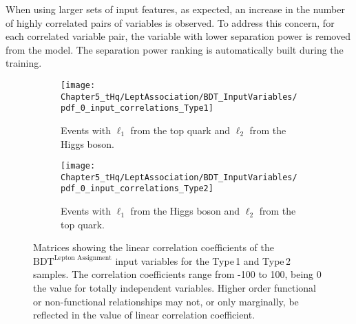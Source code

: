 When using larger sets of input features, as expected, an increase in the number 
of highly correlated pairs of variables is observed. To address this concern, for each 
correlated variable pair, the variable with lower separation power is removed from the model.
The separation power ranking is automatically built during the training.


\begin{figure}[h]
\centering
\begin{subfigure}[b]{0.8\textwidth}
   \texttt{[image: Chapter5\_tHq/LeptAssociation/BDT\_InputVariables/pdf\_0\_input\_correlations\_Type1]}
   \caption{Events with $\ell_{1}$ from the top quark and $\ell_{2}$ from the Higgs boson.}
   \label{fig:dileptau:Assignment_appendix:InputVars:Correlations:Type1} 
\end{subfigure}
\begin{subfigure}[b]{0.8\textwidth}
   \texttt{[image: Chapter5\_tHq/LeptAssociation/BDT\_InputVariables/pdf\_0\_input\_correlations\_Type2]}
   \caption{Events with $\ell_{1}$ from the Higgs boson and $\ell_{2}$ from the top quark.}
   \label{fig:dileptau:Assignment_appendix:InputVars:Correlations:Type2}
\end{subfigure}
\caption{Matrices showing the linear correlation coefficients of the $\text{BDT}^{\text{Lepton Assignment}}$
 input variables for the Type$\,$1 
and Type$\,$2 samples. The correlation coefficients range from -100 to 100, being 0 the value for 
totally independent variables. Higher order functional or non-functional
relationships may not, or only marginally, be reflected in the value of linear correlation coefficient.}
\label{fig:dileptau:Assignment_appendix:InputVars:Correlations} %
\end{figure}



